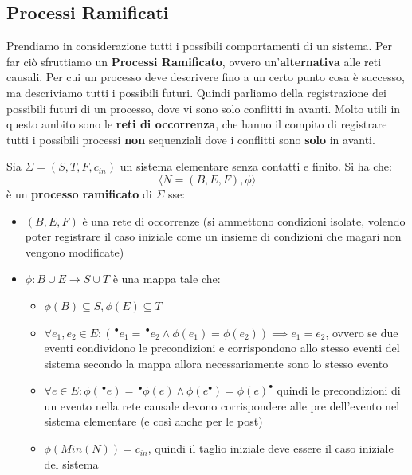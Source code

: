 \subsection{Processi Ramificati}
Prendiamo in considerazione tutti i possibili comportamenti di un sistema. Per far ciò sfruttiamo un \textbf{Processi Ramificato}, ovvero un'\textbf{alternativa} alle reti causali. Per cui un processo deve descrivere fino a un certo punto cosa è successo, ma descriviamo tutti i possibili futuri. Quindi parliamo della registrazione dei possibili futuri di un processo, dove vi sono solo conflitti in avanti. Molto utili in questo ambito sono le \textbf{reti di occorrenza}, che hanno il compito di registrare tutti i possibili processi \textbf{non} sequenziali dove i conflitti sono \textbf{solo} in avanti.
\begin{definizione}
  Sia $\Sigma=(S, T, F, c_{in})$ un sistema elementare senza contatti e
  finito. Si ha che:
  \[\langle N=(B, E, F), \phi\rangle\]
  è un \textbf{processo ramificato} di $\Sigma$ sse:
  \begin{itemize}
    \item $(B, E, F)$ è una rete di occorrenze (si ammettono condizioni isolate,
    volendo poter registrare il caso iniziale come un insieme di condizioni che
    magari non vengono modificate)
    \item $\phi:B\cup E\to S\cup T$ è una mappa tale che:
    \begin{itemize}
      \item $\phi(B)\subseteq S, \phi(E)\subseteq T$
      \item $\forall e_1, e_2\in E:(\,^\bullet e_1=\,^\bullet e_2\land
      \phi(e_1)=\phi(e_2))\implies e_1=e_2$, ovvero se due eventi condividono le
      precondizioni e corrispondono allo stesso eventi del sistema secondo la
      mappa allora necessariamente sono lo stesso evento
      \item $\forall e\in E:\phi(\,^\bullet e)=\,^\bullet
      \phi(e)\land\phi(e^\bullet)=\phi(e)^\bullet$ quindi le precondizioni di un
      evento nella rete causale devono corrispondere alle pre dell'evento nel
      sistema elementare (e così anche per le post)
      \item $\phi(Min(N))=c_{in}$, quindi il taglio iniziale deve essere il caso
      iniziale del sistema
    \end{itemize}
  \end{itemize}
\end{definizione} \vspace{5mm} %
